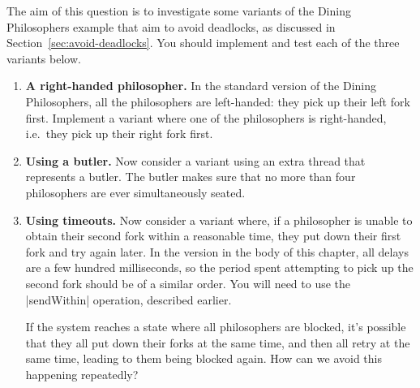 \begin{question}
\label{ex:diningPhils}
The aim of this question is to investigate some variants of the Dining
Philosophers example that aim to avoid deadlocks, as discussed in
Section~\ref{sec:avoid-deadlocks}.  You should implement and test each of the
three variants below.
%
\begin{enumerate}
\item \textbf{A right-handed philosopher.}
In the standard version of the Dining Philosophers, all the philosophers are
left-handed: they pick up their left fork first.  Implement a variant where
one of the philosophers is right-handed, i.e.\ they pick up their right fork
first.

\item \textbf{Using a butler.} Now consider a variant using an extra
  thread that represents a butler.  The butler makes sure that no more than
  four philosophers are ever simultaneously seated.

\item \textbf{Using timeouts.} Now consider a variant where, if a philosopher
  is unable to obtain their second fork within a reasonable time, they put
  down their first fork and try again later.  In the version in the body of this
  chapter, all delays are a few hundred milliseconds, so the period spent
  attempting to pick up the second fork should be of a similar order.  You
  will need to use the |sendWithin| operation, described earlier.

If the system reaches a state where all philosophers are blocked, it's
possible that they all put down their forks at the same time, and then all
retry at the same time, leading to them being blocked again.  How can we avoid
this happening repeatedly?
\end{enumerate}
\end{question}


